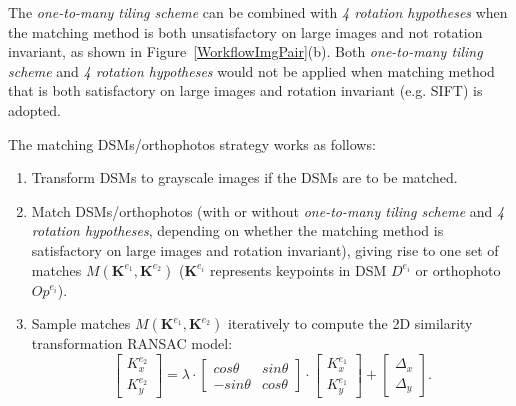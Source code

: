 The \textit{one-to-many tiling scheme} can be combined with \textit{4 rotation hypotheses} when the matching method is both unsatisfactory on large images and not rotation invariant, as shown in Figure~\ref{WorkflowImgPair}(b).
Both \textit{one-to-many tiling scheme} and \textit{4 rotation hypotheses} would not be applied when matching method that is both satisfactory on large images and rotation invariant (e.g. SIFT) is adopted.
\par
The matching DSMs/orthophotos strategy works as follows:\\
\begin{enumerate}
    \item Transform DSMs to grayscale images if the DSMs are to be matched.
    \item Match DSMs/orthophotos (with or without \textit{one-to-many tiling scheme} and \textit{4 rotation hypotheses}, depending on whether the matching method is satisfactory on large images and rotation invariant), giving rise to one set of matches $M({\mathbf{K}^{e_1},\mathbf{K}^{e_2}})$ ($\mathbf{K}^{e_i}$ represents keypoints in DSM $D^{e_i}$ or orthophoto $Op^{e_i}$).
    \item Sample matches $M({\mathbf{K}^{e_1},\mathbf{K}^{e_2}})$ iteratively to compute the 2D similarity transformation RANSAC model:
\begin{equation}
\left [ \begin{array}{c}
{K}_x^{e_2}\\
{K}_y^{e_2}
\end{array}
\right ] =\lambda \cdot { \left[ \begin{array}{cc}
    cos\theta & sin\theta\\
    -sin\theta & cos\theta
    \end{array} 
    \right ]} \cdot {\left [ \begin{array}{c}
    {K}_x^{e_1}\\
    {K}_y^{e_1}
    \end{array}
    \right ]} + \left [ \begin{array}{c}
\Delta_x\\
\Delta_y
\end{array}
\right ]. \label{eq:2DSim}
\end{equation}


\end{enumerate}
